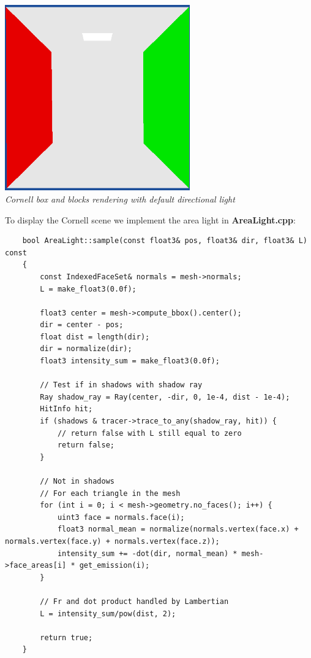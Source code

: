 \documentclass[a4,12pt]{article}
\begin{document}
	\begin{center}
		\includegraphics[width=8cm]{./Worksheet4/cornellblocks_flat.png}\\
		\textit{Cornell box and blocks rendering with default directional light}
	\end{center}
	
	To display the Cornell scene we implement the area light in \textbf{AreaLight.cpp}:
	
	\begin{lstlisting}
	bool AreaLight::sample(const float3& pos, float3& dir, float3& L) const
	{
		const IndexedFaceSet& normals = mesh->normals;
		L = make_float3(0.0f);
		
		float3 center = mesh->compute_bbox().center();
		dir = center - pos;
		float dist = length(dir);
		dir = normalize(dir);
		float3 intensity_sum = make_float3(0.0f);
		
		// Test if in shadows with shadow ray
		Ray shadow_ray = Ray(center, -dir, 0, 1e-4, dist - 1e-4);
		HitInfo hit;
		if (shadows & tracer->trace_to_any(shadow_ray, hit)) {
			// return false with L still equal to zero
			return false;
		}
		
		// Not in shadows
		// For each triangle in the mesh
		for (int i = 0; i < mesh->geometry.no_faces(); i++) {
			uint3 face = normals.face(i);
			float3 normal_mean = normalize(normals.vertex(face.x) + normals.vertex(face.y) + normals.vertex(face.z));
			intensity_sum += -dot(dir, normal_mean) * mesh->face_areas[i] * get_emission(i);
		}
		
		// Fr and dot product handled by Lambertian
		L = intensity_sum/pow(dist, 2);
		
		return true;
	}
	\end{lstlisting}
	
\end{document}
